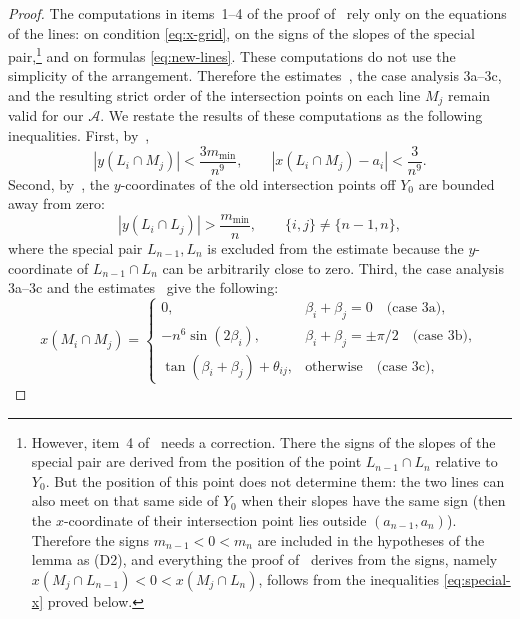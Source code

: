\begin{proof}
The computations in items~1--4 of the proof of~\cite[Prop.~3.1]{bbl} rely only on the equations of the lines: on condition \eqref{eq:x-grid}, on the signs of the slopes of the special pair,\footnote{However, item~4 of~\cite[Prop.~3.1]{bbl} needs a correction. There the signs of the slopes of the special pair are derived from the position of the point $L_{n-1}\cap L_n$ relative to $Y_0$. But the position of this point does not determine them: the two lines can also meet on that same side of $Y_0$ when their slopes have the same sign (then the $x$-coordinate of their intersection point lies outside $(a_{n-1},a_n)$). Therefore the signs $m_{n-1}<0<m_n$ are included in the hypotheses of the lemma as (D2), and everything the proof of~\cite[Prop.~3.1]{bbl} derives from the signs, namely $x(M_j\cap L_{n-1})<0<x(M_j\cap L_n)$, follows from the inequalities \eqref{eq:special-x} proved below.}
and on formulas \eqref{eq:new-lines}.
These computations do not use the simplicity of the arrangement. Therefore the estimates~\cite[(3)--(9)]{bbl}, the case analysis 3a--3c, and the resulting strict order of the intersection points on each line $M_j$ remain valid for our $\mathcal A$.
We restate the results of these computations as the following inequalities.
First, by~\cite[(6)]{bbl},
\begin{equation}\label{eq:L-M-coord}
|y(L_i\cap M_j)|<\frac{3m_{\min}}{n^9},
\qquad
|x(L_i\cap M_j)-a_i|<\frac3{n^9}.
\end{equation}
Second, by~\cite[(5)]{bbl}, the $y$-coordinates of the old intersection points off $Y_0$ are bounded away from zero:
\begin{equation}\label{eq:L-L-coord}
|y(L_i\cap L_j)|>\frac{m_{\min}}n,
\qquad \{i,j\}\neq\{n-1,n\},
\end{equation}
where the special pair $L_{n-1},L_n$ is excluded from the estimate because the $y$-coordinate of $L_{n-1}\cap L_n$ can be arbitrarily close to zero. Third, the case analysis 3a--3c and the estimates~\cite[(7)--(9)]{bbl} give the following:
\begin{equation}\label{eq:M-M-coord}
x(M_i\cap M_j)=
\begin{cases}
0, & \beta_i+\beta_j=0 \quad\text{(case 3a)},\\
-n^6\sin(2\beta_i), & \beta_i+\beta_j=\pm\pi/2 \quad\text{(case 3b)},\\
\tan(\beta_i+\beta_j)+\theta_{ij}, & \text{otherwise} \quad\text{(case 3c)},
\end{cases}
\end{equation}

\end{proof}
